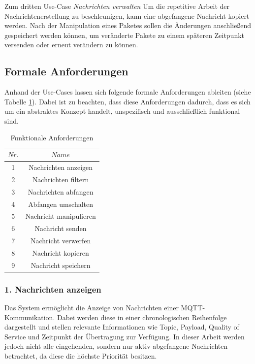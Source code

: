     Zum dritten Use-Case \emph{Nachrichten verwalten}
        Um die repetitive Arbeit der Nachrichtenerstellung zu beschleunigen, kann eine abgefangene Nachricht kopiert werden.
        Nach der Manipulation eines Paketes sollen die Änderungen anschließend gespeichert werden können, um veränderte Pakete zu einem späteren Zeitpunkt versenden oder erneut verändern zu können.
    
    \subsection{Formale Anforderungen} \label{FormaleAnforderungen}
    Anhand der Use-Cases lassen sich folgende formale Anforderungen ableiten (siehe Tabelle \ref{tab:functional_requirements}).
    Dabei ist zu beachten, dass diese Anforderungen dadurch, dass es sich um ein abstraktes Konzept handelt, unspezifisch und ausschließlich funktional sind.
    \begin{table}[h]
        \centering
        \begin{tabular}{c|c}
            \hline
            $Nr.$ & $Name$ \\ \hline
            1 & Nachrichten anzeigen \\ \hline
            2 & Nachrichten filtern \\ \hline
            3 & Nachrichten abfangen \\ \hline
            4 & Abfangen umschalten \\ \hline
            5 & Nachricht manipulieren \\ \hline
            6 & Nachricht senden \\ \hline
            7 & Nachricht verwerfen \\ \hline
            8 & Nachricht kopieren \\ \hline
            9 & Nachricht speichern \\ \hline
        \end{tabular}
        \caption{Funktionale Anforderungen}
        \label{tab:functional_requirements}
    \end{table}
    
        \subsubsection{1. Nachrichten anzeigen}
        Das System ermöglicht die Anzeige von Nachrichten einer \ac{MQTT}-Kommunikation.
        Dabei werden diese in einer chronologischen Reihenfolge dargestellt und stellen relevante Informationen wie Topic, Payload, Quality of Service und Zeitpunkt der Übertragung zur Verfügung.
        In dieser Arbeit werden jedoch nicht alle eingehenden, sondern nur aktiv abgefangene Nachrichten betrachtet, da diese die höchste Priorität besitzen.
        
